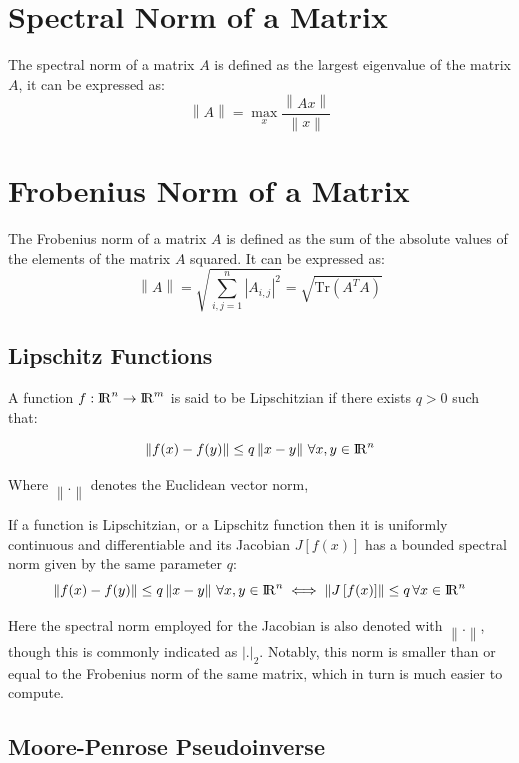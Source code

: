 \documentclass[10pt,journal,compsoc]{IEEEtran}
\newcommand{\norm}[1]{\left\lVert#1\right\rVert}
\newcommand{\reals}{{\rm I\!R}}
\begin{document}
\section{Spectral Norm of a Matrix}
The spectral norm of a matrix $A$ is defined as the largest eigenvalue of the matrix $A$, it can be expressed as:
\begin{equation}
	\norm{A} = \max_x \frac{\norm{Ax}}{\norm{x}}
\end{equation}

\section{Frobenius Norm of a Matrix}
The Frobenius norm of a matrix $A$ is defined as the sum of the absolute values of the elements of the matrix $A$ squared. It can be expressed as:
\begin{equation}
		\norm{A} = \sqrt{\sum_{i,j=1}^n |A_{i,j}|^2} = \sqrt{\text{Tr}\left(A^TA\right)}
\end{equation}

\subsection{Lipschitz Functions}

A function $f:\reals^n \rightarrow \reals^m$ is said to be Lipschitzian if there exists $q>0$ such that:

\begin{equation}
\norm{ f(x) - f(y) } \leq q \norm{x - y} \, \forall x,y \in \reals^n 
\end{equation}

Where $\norm{ . }$ denotes the Euclidean vector norm, 

If a function is Lipschitzian, or a Lipschitz function then it is uniformly continuous and differentiable and its Jacobian $J\left[ f(x)\right]$ has a bounded spectral norm given by the same parameter $q$:
\begin{dmath}
{\norm{ f(x) - f(y) } \leq q \norm{ x - y } \, \forall x,y \in \reals^n }\iff {\norm {J\left[ f(x)\right] } \leq q \, \forall x \in \reals^n }
\end{dmath}

Here the spectral norm employed for the Jacobian is also denoted with $\norm{ . }$, though this is commonly indicated as $\left| . \right|_2$. Notably, this norm is smaller than or equal to the Frobenius norm of the same matrix, which in turn is much easier to compute.

\subsection{Moore-Penrose Pseudoinverse}
\end{document}

